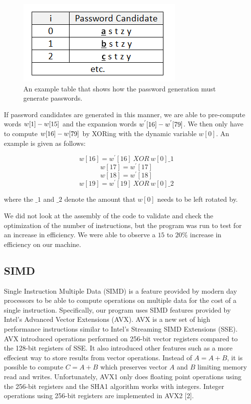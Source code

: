 \documentclass[letterpaper, 10 pt, conference]{ieeeconf}  %
\begin{document}
\begin{figure}[thpb]
	\centering
	\includegraphics[scale=.75]{passwordGeneration}
    \caption{An example table that shows how the password generation must generate passwords.}
\end{figure}

If password candidates are generated in this manner, we are able to pre-compute words $w[1]\--w[15]$ and the expansion words $w^{'}[16]\--w^{'}[79]$.  We then only have to compute $w[16]\--w[79]$ by XORing with the dynamic variable $w[0]$.  An example is given as follows:


$$w[16] = w^{'}[16]\ XOR\ w[0]\_1$$
$$w[17] = w^{'}[17]$$
$$w[18] = w^{'}[18]$$
$$w[19] = w^{'}[19]\ XOR\ w[0]\_2$$

\noindent
where the $\_1$ and $\_2$ denote the amount that $w[0]$ needs to be left rotated by.

We did not look at the assembly of the code to validate and check the  optimization of the number of instructions, but the program was run to test for an increase in efficiency.  We were able to observe a $15$ to $20\%$ increase in efficiency on our machine.
   
\subsection{SIMD}

Single Instruction Multiple Data (SIMD) is a feature provided by modern day processors to be able to compute operations on multiple data for the cost of a single instruction.  Specifically, our program uses SIMD features provided by Intel's Advanced Vector Extensions (AVX). AVX is a new set of high performance instructions similar to Intel's Streaming SIMD Extensions (SSE).  AVX introduced operations performed on 256-bit vector registers compared to the 128-bit registers of SSE.  It also introduced other features such as a more effecient way to store results from vector operations.  Instead of $A = A + B$, it is possible to compute $C = A + B$ which preserves vector $A$ and $B$ limiting memory read and writes.  Unfortunately, AVX1 only does floating point operations using the 256-bit registers and the SHA1 algorithm works with integers.  Integer operations using 256-bit registers are implemented in AVX2 [2].
\end{document}

